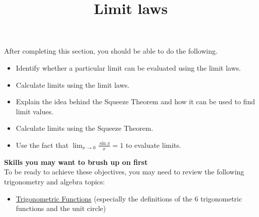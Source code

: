 \documentclass{ximera}
\title{Limit laws}
\begin{document}
\begin{abstract}
\end{abstract}

\maketitle

\begin{sectionOutcomes}
After completing this section, you should be able to do the following.

\begin{itemize}
\item Identify whether a particular limit can be evaluated using the limit laws.
\item Calculate limits using the limit laws. 
\item Explain the idea behind the Squeeze Theorem and how it can be used to find limit values.
\item Calculate limits using the Squeeze Theorem.
\item Use the fact that $\lim_{x \to 0} \frac{\sin x}{x} = 1$ to evaluate limits.
\end{itemize}
\end{sectionOutcomes}

\phantom{text}%


\textbf{Skills you may want to brush up on first} \\ To be ready to achieve these objectives, you may need to review the following trigonometry and algebra topics: 
\begin{itemize}
    \item \href{https://ximera.osu.edu/math160fa17/m160prerequisites/PreRequisiteXards/U7Trigonometry/7.1TrigFunctions/7.1TitlePage/7.1TitlePage}{Trigonometric Functions} (especially the definitions of the 6 trigonometric functions and the unit circle)
\end{itemize}
\end{document}
